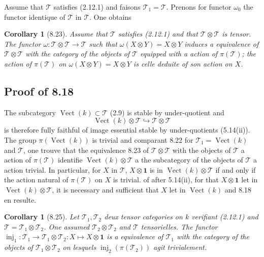 \documentclass[12pt,a4paper]{article}
\theoremstyle{plain}
\newtheorem{corollary}[theorem]{Corollary}
\theoremstyle{definition}
\DeclareMathOperator{\Vect}{Vect}
\DeclareMathOperator{\inj}{inj}
\begin{document}
Assume that $\mathcal{T}$ satisfies (2.12.1) and faisons $\mathcal{T}_1 = \mathcal{T}$. Prenons for functor $\omega_0$ the functor identique of $\mathcal{T}$ in $\mathcal{T}$. One obtains
\begin{corollary}[8.23]
Assume that $\mathcal{T}$ satisfies (2.12.1) and that $\mathcal{T} \otimes \mathcal{T}$ is tensor. The functor $\omega : \mathcal{T} \otimes \mathcal{T} \to \mathcal{T}$ such that $\omega(X \otimes Y) = X \otimes Y$ induces a equivalence of $\mathcal{T} \otimes \mathcal{T}$ with the category of the objects of $\mathcal{T}$ equipped with a action of $\pi(\mathcal{T})$; the action of $\pi(\mathcal{T})$ on $\omega(X \otimes Y) = X \otimes Y$ is celle deduite of son action on $X$.
\end{corollary}

\subsection{Proof of 8.18}

The subcategory $\Vect(k) \subset \mathcal{T}$ (2.9) is stable by under-quotient and
\[
\Vect(k) \otimes \mathcal{T} \hookrightarrow \mathcal{T} \otimes \mathcal{T}
\]
is therefore fully faithful of image essential stable by under-quotients (5.14(ii)). The group $\pi(\Vect(k))$ is trivial and comparant 8.22 for $\mathcal{T}_1 = \Vect(k)$ and $\mathcal{T}$, one trouve that the equivalence 8.23 of $\mathcal{T} \otimes \mathcal{T}$ with the objects of $\mathcal{T}$ a action of $\pi(\mathcal{T})$ identifie $\Vect(k) \otimes \mathcal{T}$ a the subcategory of the objects of $\mathcal{T}$ a action trivial. In particular, for $X$ in $\mathcal{T}$, $X \otimes \mathbf{1}$ is in $\Vect(k) \otimes \mathcal{T}$ if and only if the action natural of $\pi(\mathcal{T})$ on $X$ is trivial. of after 5.14(ii), for that $X \otimes \mathbf{1}$ let in $\Vect(k) \otimes \mathcal{T}$, it is necessary and sufficient that $X$ let in $\Vect(k)$ and 8.18 en resulte.

\begin{corollary}[8.25]
Let $\mathcal{T}_1, \mathcal{T}_2$ deux tensor categories on $k$ verifiant (2.12.1) and $\mathcal{T} = \mathcal{T}_1 \otimes \mathcal{T}_2$. One assumed $\mathcal{T}_2 \otimes \mathcal{T}_2$ and $\mathcal{T}$ tensorielles. The functor $\inj_1 : \mathcal{T}_1 \to \mathcal{T}_1 \otimes \mathcal{T}_2 : X \mapsto X \otimes \mathbf{1}$ is a equivalence of $\mathcal{T}_1$ with the category of the objects of $\mathcal{T}_1 \otimes \mathcal{T}_2$ on lesquels $\inj_2(\pi(\mathcal{T}_2))$ agit trivialement.
\end{corollary}
\end{document}
